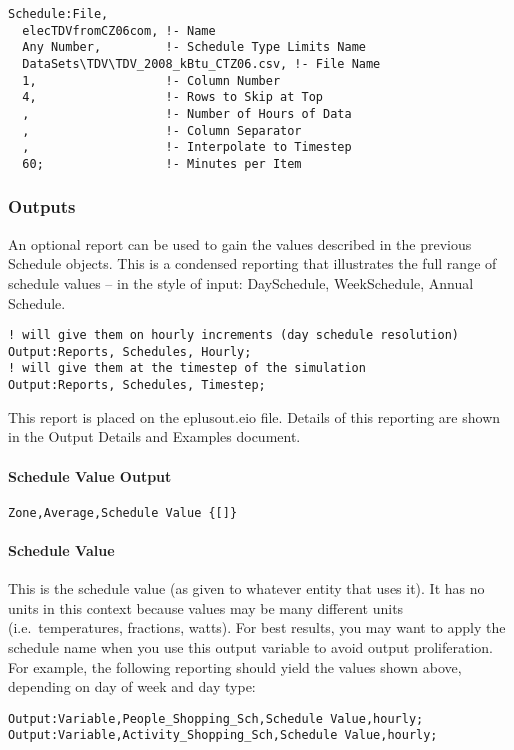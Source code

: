 \begin{lstlisting}
Schedule:File,
  elecTDVfromCZ06com, !- Name
  Any Number,         !- Schedule Type Limits Name
  DataSets\TDV\TDV_2008_kBtu_CTZ06.csv, !- File Name
  1,                  !- Column Number
  4,                  !- Rows to Skip at Top
  ,                   !- Number of Hours of Data
  ,                   !- Column Separator
  ,                   !- Interpolate to Timestep
  60;                 !- Minutes per Item
\end{lstlisting}

\subsubsection{Outputs}\label{outputs-031}

An optional report can be used to gain the values described in the previous Schedule objects. This is a condensed reporting that illustrates the full range of schedule values -- in the style of input: DaySchedule, WeekSchedule, Annual Schedule.

\begin{lstlisting}
! will give them on hourly increments (day schedule resolution)
Output:Reports, Schedules, Hourly;
! will give them at the timestep of the simulation
Output:Reports, Schedules, Timestep;
\end{lstlisting}

This report is placed on the eplusout.eio file. Details of this reporting are shown in the Output Details and Examples document.

\paragraph{Schedule Value Output}\label{schedule-value-output}

\begin{lstlisting}
Zone,Average,Schedule Value {[]}
\end{lstlisting}

\paragraph{Schedule Value}\label{schedule-value}

This is the schedule value (as given to whatever entity that uses it). It has no units in this context because values may be many different units (i.e.~temperatures, fractions, watts). For best results, you may want to apply the schedule name when you use this output variable to avoid output proliferation. For example, the following reporting should yield the values shown above, depending on day of week and day type:

\begin{lstlisting}
Output:Variable,People_Shopping_Sch,Schedule Value,hourly;
Output:Variable,Activity_Shopping_Sch,Schedule Value,hourly;
\end{lstlisting}

